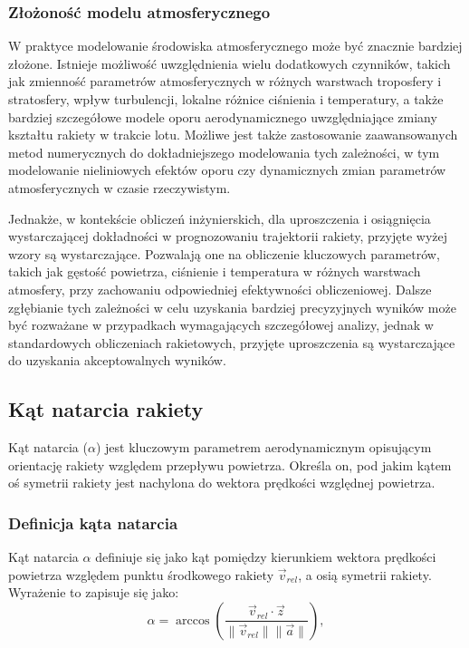 \subsubsection{Złożoność modelu atmosferycznego}

W praktyce modelowanie środowiska atmosferycznego może być znacznie bardziej złożone. Istnieje możliwość uwzględnienia wielu dodatkowych czynników, takich jak zmienność parametrów atmosferycznych w różnych warstwach troposfery i stratosfery, wpływ turbulencji, lokalne różnice ciśnienia i temperatury, a także bardziej szczegółowe modele oporu aerodynamicznego uwzględniające zmiany kształtu rakiety w trakcie lotu. Możliwe jest także zastosowanie zaawansowanych metod numerycznych do dokładniejszego modelowania tych zależności, w tym modelowanie nieliniowych efektów oporu czy dynamicznych zmian parametrów atmosferycznych w czasie rzeczywistym.

Jednakże, w kontekście obliczeń inżynierskich, dla uproszczenia i osiągnięcia wystarczającej dokładności w prognozowaniu trajektorii rakiety, przyjęte wyżej wzory są wystarczające. Pozwalają one na obliczenie kluczowych parametrów, takich jak gęstość powietrza, ciśnienie i temperatura w różnych warstwach atmosfery, przy zachowaniu odpowiedniej efektywności obliczeniowej. Dalsze zgłębianie tych zależności w celu uzyskania bardziej precyzyjnych wyników może być rozważane w przypadkach wymagających szczegółowej analizy, jednak w standardowych obliczeniach rakietowych, przyjęte uproszczenia są wystarczające do uzyskania akceptowalnych wyników.


\subsection{Kąt natarcia rakiety} \label{sec:kąt-natarcia-rakiety.}

Kąt natarcia ($\alpha$) jest kluczowym parametrem aerodynamicznym opisującym orientację rakiety względem przepływu powietrza. Określa on, pod jakim kątem oś symetrii rakiety jest nachylona do wektora prędkości względnej powietrza.

\subsubsection{Definicja kąta natarcia}
Kąt natarcia $\alpha$ definiuje się jako kąt pomiędzy kierunkiem wektora
prędkości powietrza względem punktu środkowego rakiety $\vec{v}_{rel}$, a osią
symetrii rakiety.
Wyrażenie to zapisuje się jako:
\begin{equation}
    \alpha = \arccos\left(
    \frac{\vec{v}_{rel} \cdot \vec{z}}{\|\vec{v}_{rel}\| \|\vec{a}\|}\right),
    \label{eq:angle_of_attack}
\end{equation}

